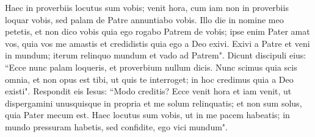 \begin{biblechapter}
\verse Haec in proverbiis locutus sum vobis; venit hora, cum iam non in proverbiis loquar vobis, sed palam de Patre annuntiabo vobis. 
\verse Illo die in nomine meo petetis, et non dico vobis quia ego rogabo Patrem de vobis; 
\verse ipse enim Pater amat vos, quia vos me amastis et credidistis quia ego a Deo exivi. 
\verse Exivi a Patre et veni in mundum; iterum relinquo mundum et vado ad Patrem". 
\verse Dicunt discipuli eius: “Ecce nunc palam loqueris, et proverbium nullum dicis. 
\verse Nunc scimus quia scis omnia, et non opus est tibi, ut quis te interroget; in hoc credimus quia a Deo existi". 
\verse Respondit eis Iesus: “Modo creditis? 
\verse Ecce venit hora et iam venit, ut dispergamini unusquisque in propria et me solum relinquatis; et non sum solus, quia Pater mecum est. 
\verse Haec locutus sum vobis, ut in me pacem habeatis; in mundo pressuram habetis, sed confidite, ego vici mundum". 
\end{biblechapter}

